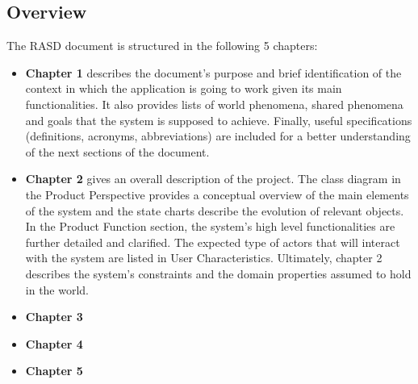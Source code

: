\documentclass{article}
\begin{document}
\subsection{Overview}
The RASD document is structured in the following 5 chapters:
\begin{itemize}
\item\textbf{Chapter 1} describes the document’s purpose and brief identification of the context in which the application is going to work given its main functionalities. It also provides lists of world phenomena, shared phenomena and goals that the system is supposed to achieve. Finally, useful specifications (definitions, acronyms, abbreviations) are included for a better understanding of the next sections of the document.
\item\textbf{Chapter 2} gives an overall description of the project. The class diagram in the Product Perspective provides a conceptual overview of the main elements of the system and the state charts describe the evolution of relevant objects. In the Product Function section, the system’s high level functionalities are further detailed and clarified. The expected type of actors that will interact with the system are listed in User Characteristics. Ultimately, chapter 2 describes the system’s constraints and the domain properties assumed to hold in the world.
\item\textbf{Chapter 3}
\item\textbf{Chapter 4}
\item\textbf{Chapter 5}
\end{itemize}
\end{document}
